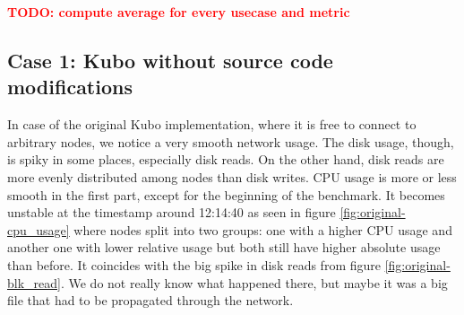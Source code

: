 \textcolor{red}{\textbf{TODO: compute average for every usecase and metric}}\\

\subsection{Case 1: Kubo without source code modifications}

In case of the original Kubo implementation, where it is free to connect to
arbitrary nodes, we notice a very smooth network usage. The disk usage, though,
is spiky in some places, especially disk reads. On the other hand, disk reads
are more evenly distributed among nodes than disk writes. CPU usage is more or
less smooth in the first part, except for the beginning of the benchmark. It
becomes unstable at the timestamp around 12:14:40 as seen in figure
\ref{fig:original-cpu_usage} where nodes split into two groups: one with a
higher CPU usage and another one with lower relative usage but both still have
higher absolute usage than before. It coincides with the big spike in disk
reads from figure \ref{fig:original-blk_read}. We do not really know what
happened there, but maybe it was a big file that had to be propagated through
the network.


